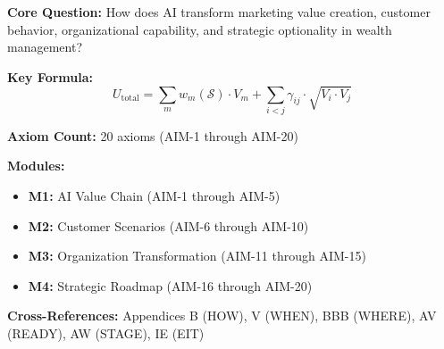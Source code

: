 \begin{tcolorbox}[colback=blue!5!white, colframe=blue!75!black,
    title=Quick Reference: AI Marketing Transformation Axioms]

\textbf{Core Question:} How does AI transform marketing value creation,
customer behavior, organizational capability, and strategic optionality
in wealth management?

\textbf{Key Formula:}
\begin{equation}
U_{\text{total}} = \sum_{m} w_m(\mathcal{S}) \cdot V_m + \sum_{i < j} \gamma_{ij} \cdot \sqrt{V_i \cdot V_j}
\label{eq:aim-integrated}
\end{equation}

\textbf{Axiom Count:} 20 axioms (AIM-1 through AIM-20)

\textbf{Modules:}
\begin{itemize}[nosep]
\item \textbf{M1:} AI Value Chain (AIM-1 through AIM-5)
\item \textbf{M2:} Customer Scenarios (AIM-6 through AIM-10)
\item \textbf{M3:} Organization Transformation (AIM-11 through AIM-15)
\item \textbf{M4:} Strategic Roadmap (AIM-16 through AIM-20)
\end{itemize}

\textbf{Cross-References:} Appendices B (HOW), V (WHEN), BBB (WHERE),
AV (READY), AW (STAGE), IE (EIT)

\end{tcolorbox}


